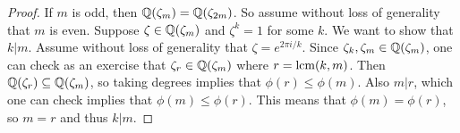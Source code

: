 \begin{proof}
  If $m$ is odd, then $\mathbb{Q}(\zeta_m) = \mathbb{Q}(\zeta_{2m})$.
  So assume without loss of generality that $m$ is even.
  Suppose $\zeta \in \mathbb{Q}(\zeta_m)$
  and $\zeta^k = 1$ for some $k$. We want to show
  that $k | m$. Assume without loss of generality that
  $\zeta = e^{2\pi i / k}$. Since
  $\zeta_k, \zeta_m \in \mathbb{Q}(\zeta_{m})$, one can check
  as an exercise that
  $\zeta_r \in \mathbb{Q}(\zeta_{m})$ where $r = \operatorname{lcm}(k, m)$. Then
  $\mathbb{Q}(\zeta_r) \subseteq \mathbb{Q}(\zeta_m)$, so taking
  degrees implies that $\phi(r) \le \phi(m)$. Also
  $m | r$, which one can check
  implies that $\phi(m) \le \phi(r)$.
  This means that $\phi(m) = \phi(r)$, so
  $m = r$ and thus $k | m$.
\end{proof}
